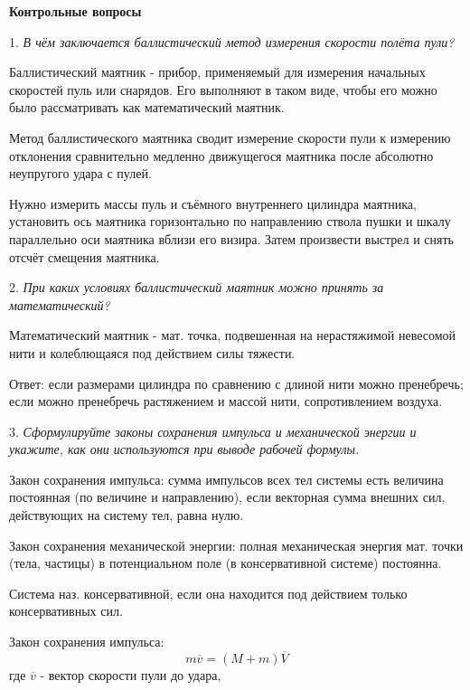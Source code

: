 \documentclass[12pt, letterpaper]{article}
\begin{document}
\begin{center}
\Large{\textbf{\newline\newline\newline Контрольные вопросы}}\
\end{center}

1. \textit{В чём заключается баллистический метод измерения скорости полёта пули?}

Баллистический маятник - прибор, применяемый для измерения начальных скоростей пуль или снарядов. Его выполняют в таком виде, чтобы его можно было рассматривать как математический маятник.

Метод баллистического маятника сводит измерение скорости пули к измерению отклонения сравнительно медленно движущегося маятника после абсолютно неупругого удара с пулей.

Нужно измерить массы пуль и съёмного внутреннего цилиндра маятника, установить ось маятника горизонтально по направлению ствола пушки и шкалу параллельно оси маятника вблизи его визира. Затем произвести выстрел и снять отсчёт смещения маятника.\newline

2. \textit{При каких условиях баллистический маятник можно принять за математический?}

Математический маятник - мат. точка, подвешенная на нерастяжимой невесомой нити и колеблющаяся под действием силы тяжести.

Ответ: если размерами цилиндра по сравнению с длиной нити можно пренебречь; если можно пренебречь растяжением и массой нити, сопротивлением воздуха. \newline

3. \textit{Сформулируйте законы сохранения импульса и механической энергии и укажите, как они используются при выводе рабочей формулы.}

Закон сохранения импульса: сумма импульсов всех тел системы есть величина постоянная (по величине и направлению), если векторная сумма внешних сил, действующих на систему тел, равна нулю.

Закон сохранения механической энергии: полная механическая энергия мат. точки (тела, частицы) в потенциальном поле (в консервативной системе) постоянна.

Система наз. консервативной, если она находится под действием только консервативных сил.

Закон сохранения импульса:
\[m\overline{v}=(M+m)\overline{V}\]
где \(\overline{v}\) - вектор скорости пули до удара,
\end{document}
